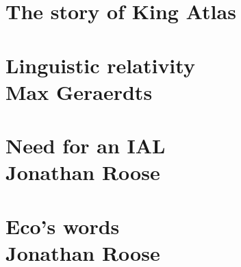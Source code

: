 


\section{The story of King Atlas}




\section{Linguistic relativity \\ {\small Max Geraerdts}}


\section{Need for an IAL \\ {\small Jonathan Roose}}

\section{Eco's words \\ {\small Jonathan Roose}}
